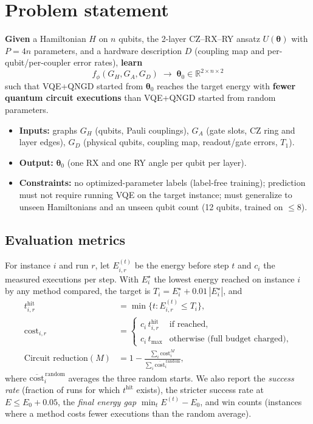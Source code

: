 \documentclass{ssnreview}
\begin{document}
\chapter{Problem statement}\label{ch:problem}

\textbf{Given} a Hamiltonian $H$ on $n$ qubits, the 2-layer CZ--RX--RY ansatz
$U(\boldsymbol\theta)$ with $P=4n$ parameters, and a hardware description $D$ (coupling map and
per-qubit/per-coupler error rates), \textbf{learn}
\begin{equation}
  f_\phi(G_H, G_A, G_D) \;\to\; \boldsymbol\theta_0 \in \mathbb{R}^{2\times n\times 2}
\end{equation}
such that VQE+QNGD started from $\boldsymbol\theta_0$ reaches the target energy with
\textbf{fewer quantum circuit executions} than VQE+QNGD started from random parameters.

\begin{itemize}
  \item \textbf{Inputs:} graphs $G_H$ (qubits, Pauli couplings), $G_A$ (gate slots, CZ ring and
        layer edges), $G_D$ (physical qubits, coupling map, readout/gate errors, $T_1$).
  \item \textbf{Output:} $\boldsymbol\theta_0$ (one RX and one RY angle per qubit per layer).
  \item \textbf{Constraints:} no optimized-parameter labels (label-free training); prediction must
        not require running VQE on the target instance; must generalize to unseen Hamiltonians and
        an unseen qubit count (12 qubits, trained on $\le 8$).
\end{itemize}

\section{Evaluation metrics}
For instance $i$ and run $r$, let $E^{(t)}_{i,r}$ be the energy before step $t$ and $c_i$ the
measured executions per step. With $E^{\star}_i$ the lowest energy reached on instance $i$ by
any method compared, the target is $T_i=E^{\star}_i+0.01\,|E^{\star}_i|$, and
\begin{align}
  t^{\text{hit}}_{i,r} &= \min\{t : E^{(t)}_{i,r}\le T_i\}, \\
  \text{cost}_{i,r} &= \begin{cases} c_i\,t^{\text{hit}}_{i,r} & \text{if reached,}\\
                                     c_i\,t_{\max} & \text{otherwise (full budget charged),}\end{cases} \\
  \text{Circuit reduction}(M) &= 1-\frac{\sum_i \text{cost}_{i}^{M}}{\sum_i \overline{\text{cost}}_{i}^{\,\text{random}}},
\end{align}
where $\overline{\text{cost}}^{\,\text{random}}_i$ averages the three random starts. We also report
the \emph{success rate} (fraction of runs for which $t^{\text{hit}}$ exists), the stricter success
rate at $E\le E_0+0.05$, the \emph{final energy gap} $\min_t E^{(t)}-E_0$, and win counts
(instances where a method costs fewer executions than the random average).
\end{document}
